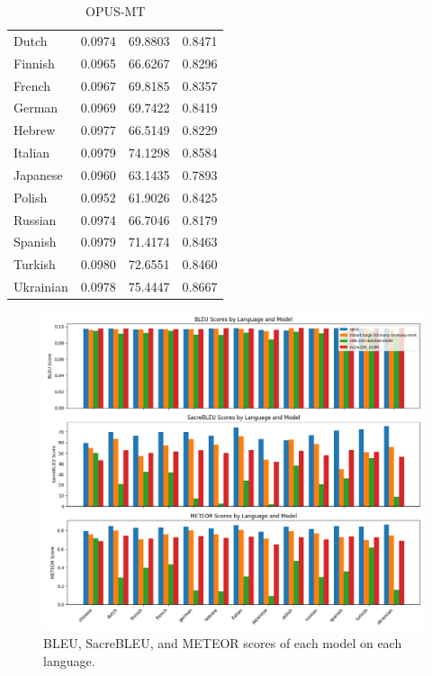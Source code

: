 \documentclass[a4paper]{article}
\begin{document}
\begin{table}[htbp]
\begin{minipage}{0.49\linewidth}
\begin{tabular}{|l|r|r|r|}
            Dutch             & 0.0974        & 69.8803            & 0.8471          \\
            Finnish           & 0.0965        & 66.6267            & 0.8296          \\
            French            & 0.0967        & 69.8185            & 0.8357          \\
            German            & 0.0969        & 69.7422            & 0.8419          \\
            Hebrew            & 0.0977        & 66.5149            & 0.8229          \\
            Italian           & 0.0979        & 74.1298            & 0.8584          \\
            Japanese          & 0.0960        & 63.1435            & 0.7893          \\
            Polish            & 0.0952        & 61.9026            & 0.8425          \\
            Russian           & 0.0974        & 66.7046            & 0.8179          \\
            Spanish           & 0.0979        & 71.4174            & 0.8463          \\
            Turkish           & 0.0980        & 72.6551            & 0.8460          \\
            Ukrainian         & 0.0978        & 75.4447            & 0.8667          \\
            \hline
        \end{tabular}
        \caption{OPUS-MT}
    \end{minipage}
\end{table}


\begin{figure}[htbp]
    \centering
    \includegraphics[width=1\linewidth]{figures/metrics_bar.png}
    \caption{BLEU, SacreBLEU, and METEOR scores of each model on each language.}
    \label{fig:result_visual}
\end{figure}
\end{document}

